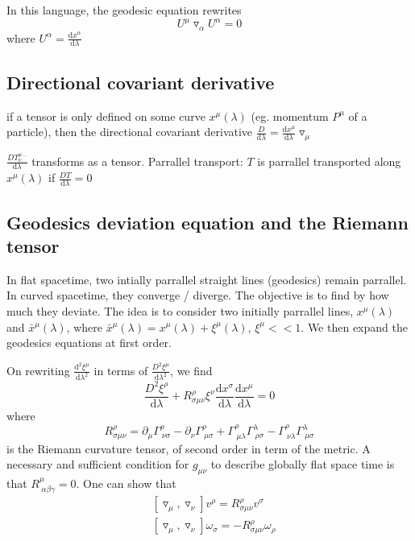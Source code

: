 \documentclass[a4paper]{book}
\theoremstyle{definition}
\theoremstyle{remark}
\begin{document}
In this language, the geodesic equation rewrites 
\begin{equation}
    U^\mu \triangledown_\alpha U^\alpha = 0
\end{equation}
where $U^\alpha = \frac{\text{d}x^\alpha}{\text{d}\lambda}$

\subsection{Directional covariant derivative}

if a tensor is only defined on some curve $x^\mu(\lambda)$ (eg. momentum $P^\mu$ of a particle), then the directional covariant derivative $\frac{D}{\text{d}\lambda} = \frac{\text{d} x^\mu}{\text{d}\lambda} \triangledown_\mu$\par \medskip 

$\frac{DT^{\mu\dots}_{\nu\dots}}{\text{d}\lambda}$ transforms as a tensor. Parrallel transport: $T$ is parrallel transported along $x^\mu(\lambda)$ if $\frac{DT}{\text{d}\lambda} = 0$


\subsection{Geodesics deviation equation and the Riemann tensor}

In flat spacetime, two intially parrallel straight lines (geodesics) remain parrallel. In curved spacetime, they converge / diverge. The objective is to find by how much they deviate. The idea is to consider two initially parrallel lines, $x^\mu(\lambda)$ and $\bar{x}^\mu(\lambda)$, where $\bar{x}^\mu(\lambda) = x^\mu(\lambda) + \xi^\mu(\lambda)$, $\xi^\mu << 1$. We then expand the geodesics equations at first order. \par \medskip 

On rewriting $\frac{\text{d}^2\xi^\mu}{\text{d}\lambda^2}$ in terms of $\frac{D^2\xi^\mu}{\text{d}\lambda^2}$, we find 
\begin{equation}
    \frac{D^2 \xi^\rho}{\text{d}\lambda} + R^\rho_{\sigma \mu\nu} \xi^\nu \frac{\text{d}x^\sigma}{\text{d}\lambda}\frac{\text{d}x^\mu}{\text{d}\lambda} = 0
\end{equation}
where 
\begin{equation}
    R^\rho_{\sigma \mu\nu} = \partial_\mu \Gamma^\rho_{~\nu\sigma} - \partial_\nu \Gamma^\rho_{~\mu\sigma} + \Gamma^\rho_{~\mu\lambda}\Gamma^\lambda_{~\rho\sigma} - \Gamma^\rho_{~\nu\lambda}\Gamma^\lambda_{~\mu\sigma}
\end{equation}
is the Riemann curvature tensor, of second order in term of the metric. A necessary and sufficient condition for $g_{\mu\nu}$ to describe globally flat space time is that $R^\mu_{~\alpha \beta\gamma} = 0$. One can show that 
\begin{equation}
    \begin{aligned}
        &[\triangledown_\mu, \triangledown_\nu] v^\rho = R^\rho_{\sigma \mu\nu} v^\sigma \\
        &[\triangledown_\mu, \triangledown_\nu] \omega_\sigma = - R^\rho_{\sigma \mu\nu} \omega_\rho 
    \end{aligned}
\end{equation}\bigskip 
\end{document}
